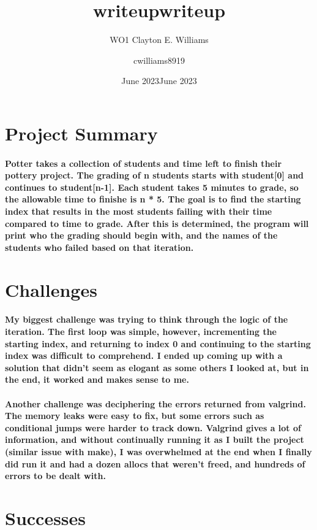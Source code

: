 \documentclass{report}
\title{writeup}
\author{WO1 Clayton E. Williams}
\date{June 2023}
\title{writeup}
\author{cwilliams8919 }
\date{June 2023}
\begin{document}
\maketitle

\section{Project Summary}
\paragraph{Potter takes a collection of students and time left to finish their pottery project.
The grading of n students starts with student[0] and continues to student[n-1]. Each student takes
5 minutes to grade, so the allowable time to finishe is n * 5. The goal is to find the
starting index that results in the most students failing with their time compared to time to grade.
After this is determined, the program will print who the grading should begin with, and 
the names of the students who failed based on that iteration.}

\section{Challenges}
\paragraph{My biggest challenge was trying to think through the logic of the iteration. The first loop
was simple, however, incrementing the starting index, and returning to index 0 and continuing
to the starting index was difficult to comprehend. I ended up coming up with a solution that 
didn't seem as elogant as some others I looked at, but in the end, it worked and makes sense to me.}
\paragraph{Another challenge was deciphering the errors returned from valgrind. The memory leaks were easy to fix,
but some errors such as conditional jumps were harder to track down. Valgrind gives a lot of information,
and without continually running it as I built the project (similar issue with make), I was overwhelmed
at the end when I finally did run it and had a dozen allocs that weren't freed, and hundreds of
errors to be dealt with.}

\section{Successes}
\end{document}
